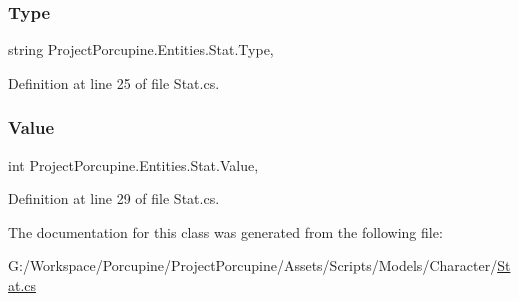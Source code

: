 \subsubsection{\texorpdfstring{Type}{Type}}
{\footnotesize\ttfamily string Project\+Porcupine.\+Entities.\+Stat.\+Type\hspace{0.3cm}{\ttfamily [get]}, {\ttfamily [set]}}



Definition at line 25 of file Stat.\+cs.

\mbox{\label{class_project_porcupine_1_1_entities_1_1_stat_a33e8c2fa06b2d09ddd0c087d163ab808}} 
\subsubsection{\texorpdfstring{Value}{Value}}
{\footnotesize\ttfamily int Project\+Porcupine.\+Entities.\+Stat.\+Value\hspace{0.3cm}{\ttfamily [get]}, {\ttfamily [set]}}



Definition at line 29 of file Stat.\+cs.



The documentation for this class was generated from the following file\+:\begin{DoxyCompactItemize}
\item 
G\+:/\+Workspace/\+Porcupine/\+Project\+Porcupine/\+Assets/\+Scripts/\+Models/\+Character/\hyperlink{_stat_8cs}{Stat.\+cs}\end{DoxyCompactItemize}
